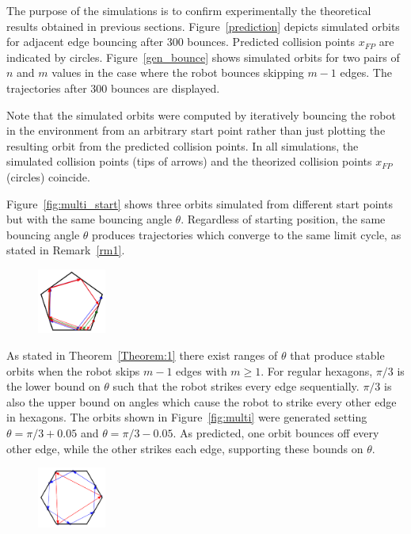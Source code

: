\documentclass[letterpaper, 10 pt, conference]{ieeeconf}  %
\begin{document}
The purpose of the simulations is to confirm experimentally
the theoretical results obtained in previous sections. Figure~\ref{prediction} 
depicts simulated orbits for adjacent edge bouncing after 300 bounces. 
Predicted collision points $x_{FP}$ are indicated by circles. Figure~\ref{gen_bounce}
shows simulated orbits for two pairs of $n$ and $m$ values in the case where the
robot bounces skipping $m-1$ edges. The trajectories after 300 bounces are displayed.

Note that the simulated orbits were computed by iteratively bouncing
the robot in the environment from an arbitrary start point rather than just
plotting the resulting orbit from the predicted collision points.
In all simulations, the simulated collision points (tips of arrows) and the
theorized collision points $x_{FP}$ (circles) coincide.

Figure~\ref{fig:multi_start} shows three orbits simulated from different 
start points but with the same bouncing angle $\theta$. Regardless of starting
position, the same bouncing angle $\theta$ produces trajectories which
converge to the same limit cycle, as stated in 
Remark~\ref{rm1}.

\begin{figure}[bh]
\centering
\includegraphics[width=0.2\textwidth]{../figs/multi_start.pdf}
\end{figure}

As stated in Theorem~\ref{Theorem:1} there exist ranges of $\theta$ that 
produce stable orbits when the robot skips $m-1$ edges with $m \geq 1$. For
regular hexagons, $\pi/3$ is the lower bound on $\theta$ such that the
robot strikes every edge sequentially. $\pi/3$ is also the upper bound on angles which
cause the robot to strike every other edge in hexagons. The orbits shown in Figure~\ref{fig:multi} were generated setting
$\theta = \pi/3 + 0.05$ and $\theta = \pi/3 - 0.05$. As predicted, one orbit
bounces off every other edge, while the other strikes each edge, supporting these
bounds on $\theta$.

\begin{figure}[bh]
\centering
\includegraphics[width=0.2\textwidth]{../figs/multi.pdf}
\end{figure}
\end{document}
